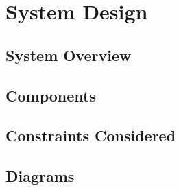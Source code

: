 \section{System Design}
\label{sec:system-design}

\subsection{System Overview}
\label{subsec:system-overview}

\subsection{Components}
\label{subsec:components}

\subsection{Constraints Considered}
\label{subsec:constraints-considered}

\subsection{Diagrams}
\label{subsec:Diagrams}